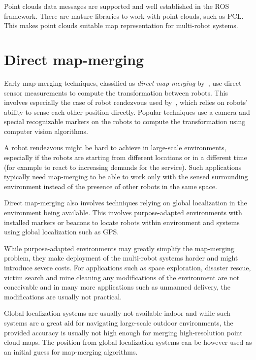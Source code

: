 Point clouds data messages are supported and well established in the \gls{ROS} framework. There are mature libraries to work with point clouds, such as \gls{PCL}. This makes point clouds suitable map representation for multi-robot systems.

\section{Direct map-merging}

Early map-merging techniques, classified as \textit{direct map-merging} by~\citet{lee2012survey}, use direct sensor measurements to compute the transformation between robots. This involves especially the case of robot rendezvous used by~\citet{zhou2006rendezvous}, which relies on robots' ability to sense each other position directly. Popular techniques use a camera and special recognizable markers on the robots to compute the transformation using computer vision algorithms.

A robot rendezvous might be hard to achieve in large-scale environments, especially if the robots are starting from different locations or in a different time (for example to react to increasing demands for the service). Such applications typically need map-merging to be able to work only with the sensed surrounding environment instead of the presence of other robots in the same space.

Direct map-merging also involves techniques relying on global localization in the environment being available. This involves purpose-adapted environments with installed markers or beacons to locate robots within environment and systems using global localization such as \gls{GPS}.

While purpose-adapted environments may greatly simplify the map-merging problem, they make deployment of the multi-robot systems harder and might introduce severe costs. For applications such as space exploration, disaster rescue, victim search and mine cleaning any modifications of the environment are not conceivable and in many more applications such as unmanned delivery, the modifications are usually not practical.

Global localization systems are usually not available indoor and while such systems are a great aid for navigating large-scale outdoor environments, the provided accuracy is usually not high enough for merging high-resolution point cloud maps. The position from global localization systems can be however used as an initial guess for map-merging algorithms.

